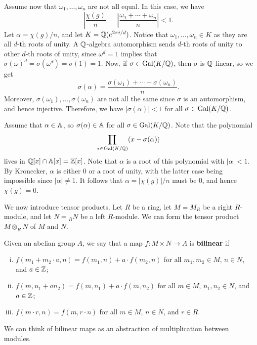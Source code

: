\begin{pf}
    Assume now that $\omega_1, \dots, \omega_n$ are not all equal. In this 
    case, we have 
    \[ \left| \frac{\chi(g)}{n} \right| = \left| \frac{\omega_1 + \cdots + 
    \omega_n}{n} \right| < 1. \] 
    Let $\alpha = \chi(g)/n$, and let $K = \mathbb{Q}(e^{2\pi i/d})$. Notice that 
    $\omega_1, \dots, \omega_n \in K$ as they are all $d$-th roots of unity. 
    A $\mathbb{Q}$-algebra automorphism sends $d$-th roots of unity to other $d$-th 
    roots of unity, since $\omega^d = 1$ implies that $\sigma(\omega)^d 
    = \sigma(\omega^d) = \sigma(1) = 1$. Now, if $\sigma \in \operatorname{Gal}(K/\mathbb{Q})$, then 
    $\sigma$ is $\mathbb{Q}$-linear, so we get 
    \[ \sigma(\alpha) = \frac{\sigma(\omega_1) + \cdots + \sigma(\omega_n)}{n}. \] 
    Moreover, $\sigma(\omega_1), \dots, \sigma(\omega_n)$ are not all the same 
    since $\sigma$ is an automorphism, and hence injective. Therefore, 
    we have $|\sigma(\alpha)| < 1$ for all $\sigma \in \operatorname{Gal}(K/\mathbb{Q})$. 

    Assume that $\alpha \in \mathbb{A}$, so $\sigma(\alpha) \in \mathbb{A}$ for all $\sigma 
    \in \operatorname{Gal}(K/\mathbb{Q})$. Note that the polynomial 
    \[ \prod_{\sigma \in \operatorname{Gal}(K/\mathbb{Q})} (x - \sigma(\alpha)) \] 
    lives in $\mathbb{Q}[x] \cap \mathbb{A}[x] = \mathbb{Z}[x]$. Note that $\alpha$ is a root of this 
    polynomial with $|\alpha| < 1$. By Kronecker, $\alpha$ is 
    either $0$ or a root of unity, with the latter case being impossible since 
    $|\alpha| \neq 1$. It follows that $\alpha = |\chi(g)|/n$ must be $0$, 
    and hence $\chi(g) = 0$. 
\end{pf}

We now introduce tensor products. Let $R$ be a ring, let $M = M_R$ be a 
right $R$-module, and let $N = {}_R N$ be a left $R$-module. We can form 
the tensor product $M \otimes_R N$ of $M$ and $N$. 

Given an abelian group $A$, we say that a map $f : M \times N \to A$ 
is {\bf bilinear} if 
\begin{enumerate}[(i)]
    \item $f(m_1 + m_2 \cdot a, n) = f(m_1, n) + a \cdot f(m_2, n)$ 
          for all $m_1, m_2 \in M$, $n \in N$, and $a \in \mathbb{Z}$; 
    \item $f(m, n_1 + an_2) = f(m, n_1) + a \cdot f(m, n_2)$ for all 
          $m \in M$, $n_1, n_2 \in N$, and $a \in \mathbb{Z}$; 
    \item $f(m \cdot r, n) = f(m, r \cdot n)$ for all $m \in M$, $n \in N$, and 
          $r \in R$. 
\end{enumerate}
We can think of bilinear maps as an abstraction of multiplication between modules. 

